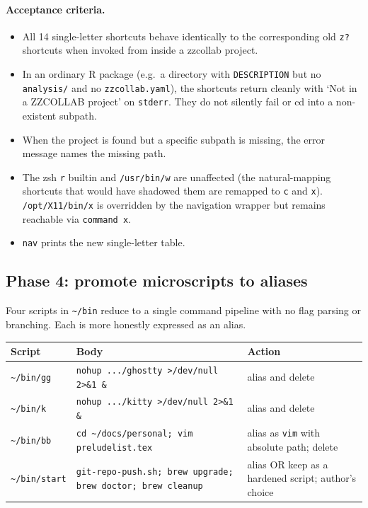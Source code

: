 \documentclass[11pt,letterpaper]{scrartcl}
\begin{document}
\paragraph{Acceptance criteria.}
\begin{itemize}
  \item All 14 single-letter shortcuts behave identically to
        the corresponding old \texttt{z?} shortcuts when invoked
        from inside a zzcollab project.
  \item In an ordinary R package (e.g.\ a directory with
        \texttt{DESCRIPTION} but no \texttt{analysis/} and no
        \texttt{zzcollab.yaml}), the shortcuts return cleanly
        with `Not in a ZZCOLLAB project' on \texttt{stderr}.
        They do not silently fail or cd into a non-existent
        subpath.
  \item When the project is found but a specific subpath is
        missing, the error message names the missing path.
  \item The zsh \texttt{r} builtin and \texttt{/usr/bin/w} are
        unaffected (the natural-mapping shortcuts that would have
        shadowed them are remapped to \texttt{c} and \texttt{x}).
        \texttt{/opt/X11/bin/x} is overridden by the navigation
        wrapper but remains reachable via \texttt{command x}.
  \item \texttt{nav} prints the new single-letter table.
\end{itemize}

\subsection{Phase 4: promote microscripts to aliases}

Four scripts in \texttt{\textasciitilde/bin} reduce to a single
command pipeline with no flag parsing or branching. Each is more
honestly expressed as an alias.

\begin{longtable}{@{}lp{2.7in}l@{}}
  \toprule
  \textbf{Script} & \textbf{Body} & \textbf{Action} \\
  \midrule
  \texttt{\textasciitilde/bin/gg}    & \texttt{nohup .../ghostty >/dev/null 2>\&1 \&}             & alias and delete \\
  \texttt{\textasciitilde/bin/k}     & \texttt{nohup .../kitty >/dev/null 2>\&1 \&}              & alias and delete \\
  \texttt{\textasciitilde/bin/bb}    & \texttt{cd \textasciitilde/docs/personal; vim preludelist.tex} & alias as \texttt{vim} with absolute path; delete \\
  \texttt{\textasciitilde/bin/start} & \texttt{git-repo-push.sh; brew upgrade; brew doctor; brew cleanup} & alias OR keep as a hardened script; author's choice \\
  \bottomrule
\end{longtable}
\end{document}
